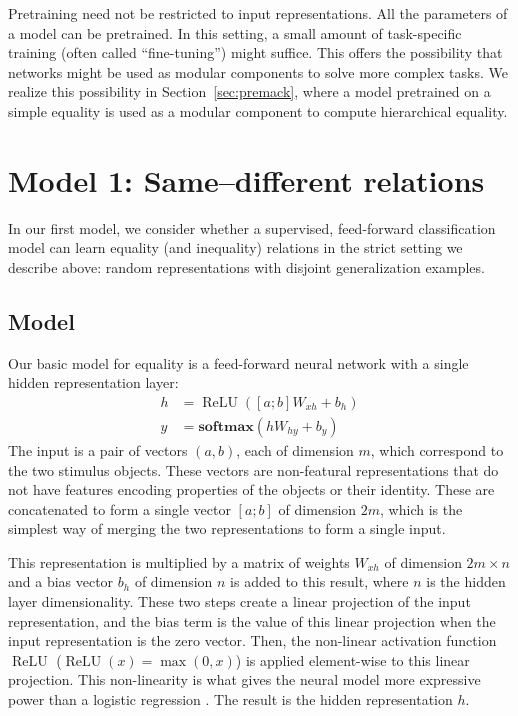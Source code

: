 \documentclass{article}
\newcommand{\secref}[1]{Section~\ref{#1}}
\newcommand{\softmax}{\mathbf{softmax}}
\DeclareMathOperator{\ReLU}{ReLU}
\begin{document}
Pretraining need not be restricted to input representations. All the parameters of a model can be pretrained. In this setting, a small amount of task-specific training (often called ``fine-tuning'') might suffice. This offers the possibility that networks might be used as modular components to solve more complex tasks. We realize this possibility in \secref{sec:premack}, where a model pretrained on a simple equality is used as a modular component to compute hierarchical equality.


\section{Model 1: Same--different relations}\label{sec:equality}

In our first model, we consider whether a supervised, feed-forward classification model can learn equality (and inequality) relations in the strict setting we describe above: random representations with disjoint generalization examples.

\subsection{Model}

Our basic model for equality is a feed-forward neural network with a single hidden representation layer:
%
\begin{align}
h &= \ReLU([a;b]W_{xh} + b_{h}) \label{eq:x2h}\\
y &= \softmax(hW_{hy} + b_{y}) \label{eq:h2y}
\end{align}
%
The input is a pair of vectors $(a, b)$, each of dimension $m$, which correspond to the two stimulus objects. These vectors are non-featural representations that do not have features encoding properties of the objects or their identity. These are concatenated to form a single vector $[a;b]$ of dimension $2m$, which is the simplest way of merging the two representations to form a single input.

This representation is multiplied by a matrix of weights $W_{xh}$ of dimension $2m \times n$ and a bias vector $b_{h}$ of dimension $n$ is added to this result, where $n$ is the hidden layer dimensionality. These two steps create a linear projection of the input representation, and the bias term is the value of this linear projection when the input representation is the zero vector. Then, the non-linear activation function $\ReLU$ ($\ReLU(x) = \max(0, x)$) is applied element-wise to this linear projection. This non-linearity is what gives the neural model more expressive power than a logistic regression \citep{Cybenko:1989,Hornik:Stinchcombe:White:1989}. The result is the hidden representation $h$.
\end{document}
